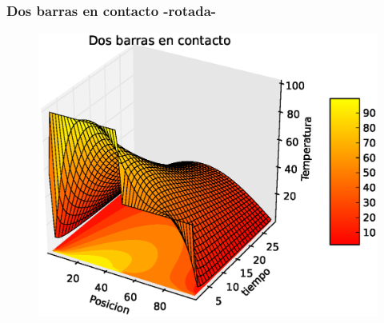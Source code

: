 \begin{frame}
\frametitle{Dos barras en contacto -rotada-}
\begin{figure}
	\centering
	\includegraphics[scale=0.5]{Imagenes/EqCalor07.eps}  
\end{figure}
\end{frame}
